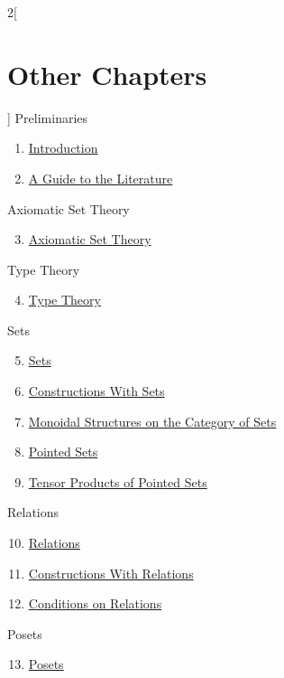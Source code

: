 \begin{multicols}{2}[\section{Other Chapters}]
\noindent
Preliminaries
\begin{enumerate}
\item \hyperref[introduction:section-phantom]{Introduction}
\item \hyperref[a-guide-to-the-literature:section-phantom]{A Guide to the Literature}
\end{enumerate}
Axiomatic Set Theory
\begin{enumerate}
\setcounter{enumi}{2}
\item \hyperref[axiomatic-set-theory:section-phantom]{Axiomatic Set Theory}
\end{enumerate}
Type Theory
\begin{enumerate}
\setcounter{enumi}{3}
\item \hyperref[type-theory:section-phantom]{Type Theory}
\end{enumerate}
Sets
\begin{enumerate}
\setcounter{enumi}{4}
\item \hyperref[sets:section-phantom]{Sets}
\item \hyperref[constructions-with-sets:section-phantom]{Constructions With Sets}
\item \hyperref[monoidal-structures-on-the-category-of-sets:section-phantom]{Monoidal Structures on the Category of Sets}
\item \hyperref[pointed-sets:section-phantom]{Pointed Sets}
\item \hyperref[tensor-products-of-pointed-sets:section-phantom]{Tensor Products of Pointed Sets}
\end{enumerate}
Relations
\begin{enumerate}
\setcounter{enumi}{9}
\item \hyperref[relations:section-phantom]{Relations}
\item \hyperref[constructions-with-relations:section-phantom]{Constructions With Relations}
\item \hyperref[conditions-on-relations:section-phantom]{Conditions on Relations}
\end{enumerate}
Posets
\begin{enumerate}
\setcounter{enumi}{12}
\item \hyperref[posets:section-phantom]{Posets}
\end{enumerate}

\end{multicols}
